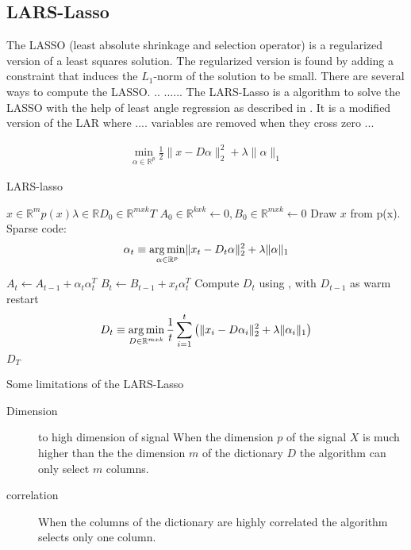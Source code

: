 \subsection* {LARS-Lasso}
\label{sec:lars}

The LASSO (least absolute shrinkage and selection operator) is a regularized version of a least squares solution.
The regularized version is found by adding a constraint that induces the $L_1$-norm of the solution to be small. \cite{Tibshirani1998}
There are several ways to compute the LASSO. .. ...... \cite{} 
The LARS-Lasso is a algorithm to solve the LASSO with the help of least angle regression
as described in \cite{Efron2004}. It is a modified version of the LAR where .... variables are removed when they cross zero ...


\begin{align}
\min_{\alpha\in\mathbb{R}^{p}}  \frac{1}{2} \lVert x - D\alpha \rVert^{2}_{2} + \lambda \lVert \alpha \rVert_{1}
\end{align}

\begin{algorithm}
\caption{LARS-lasso}
\begin{algorithmic}[1]
\REQUIRE $x \in \mathbb{R}^m  p \left( x \right) \lambda \in \mathbb{R} D_0 \in \mathbb{R}^{mxk} T$
\STATE $A_0 \in \mathbb{R}^{kxk} \gets  0, B_0 \in \mathbb{R}^{mxk}\gets 0$
\STATE Draw $x$ from p(x).
\STATE Sparse code:
\begin{align} 
\alpha_t \equiv \operatorname*{arg\,min}_{\alpha\in\mathbb{R}^{p}}  \lVert x_t - D_t\alpha \rVert^{2}_{2}  +  \lambda \lVert \alpha \rVert_{1}
\end{align}

\STATE $A_t \gets A_{t-1} + \alpha_t\alpha_t^T$
\STATE $B_t \gets B_{t-1} + x_t\alpha_t^T$
\STATE Compute $D_t$ using , with $D_{t-1}$ as warm restart 
\begin{align} 
D_t \equiv \operatorname*{arg\,min}_{D \in \mathbb{R}^{m x k}}  \frac{1}{t} \sum_{i=1}^t \left( \lVert x_i - D\alpha_i \rVert^{2}_{2}  +  \lambda \lVert \alpha_i \rVert_{1} \right) \label{eq:update}
\end{align}
\ENDFOR
\RETURN $D_T$
\end{algorithmic}
\end{algorithm}

Some limitations of the LARS-Lasso
\begin{description}
 \item[Dimension] to high dimension of signal When the dimension $p$ of the signal $X$ is 
much higher than the the dimension $m$ of the dictionary $D$ the algorithm can only select $m$ columns.

\item[correlation] When the columns of the dictionary are highly correlated the algorithm
selects only one column.
\end{description}

